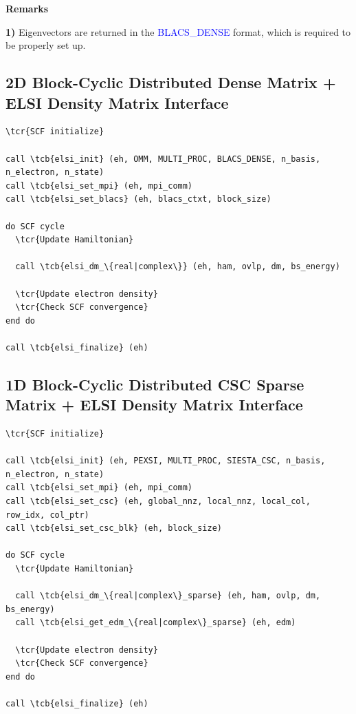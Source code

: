 \documentclass{report}
\newcommand{\tcb}[1]{\textcolor{blue}{#1}}
\newcommand{\tcr}[1]{\textcolor{red}{#1}}
\begin{document}
\textbf{Remarks}

\textbf{1)} Eigenvectors are returned in the \tcb{BLACS\_DENSE} format, which is required to be properly set up.

\subsection*{2D Block-Cyclic Distributed Dense Matrix + ELSI Density Matrix Interface}
\begin{tcolorbox}
\begin{Verbatim}[commandchars=\\\{\}]
\tcr{SCF initialize}

call \tcb{elsi_init} (eh, OMM, MULTI_PROC, BLACS_DENSE, n_basis, n_electron, n_state)
call \tcb{elsi_set_mpi} (eh, mpi_comm)
call \tcb{elsi_set_blacs} (eh, blacs_ctxt, block_size)

do SCF cycle
  \tcr{Update Hamiltonian}

  call \tcb{elsi_dm_\{real|complex\}} (eh, ham, ovlp, dm, bs_energy)

  \tcr{Update electron density}
  \tcr{Check SCF convergence}
end do

call \tcb{elsi_finalize} (eh)
\end{Verbatim}
\end{tcolorbox}

\subsection*{1D Block-Cyclic Distributed CSC Sparse Matrix + ELSI Density Matrix Interface}
\begin{tcolorbox}
\begin{Verbatim}[commandchars=\\\{\}]
\tcr{SCF initialize}

call \tcb{elsi_init} (eh, PEXSI, MULTI_PROC, SIESTA_CSC, n_basis, n_electron, n_state)
call \tcb{elsi_set_mpi} (eh, mpi_comm)
call \tcb{elsi_set_csc} (eh, global_nnz, local_nnz, local_col, row_idx, col_ptr)
call \tcb{elsi_set_csc_blk} (eh, block_size)

do SCF cycle
  \tcr{Update Hamiltonian}

  call \tcb{elsi_dm_\{real|complex\}_sparse} (eh, ham, ovlp, dm, bs_energy)
  call \tcb{elsi_get_edm_\{real|complex\}_sparse} (eh, edm)

  \tcr{Update electron density}
  \tcr{Check SCF convergence}
end do

call \tcb{elsi_finalize} (eh)
\end{Verbatim}
\end{tcolorbox}
\end{document}
